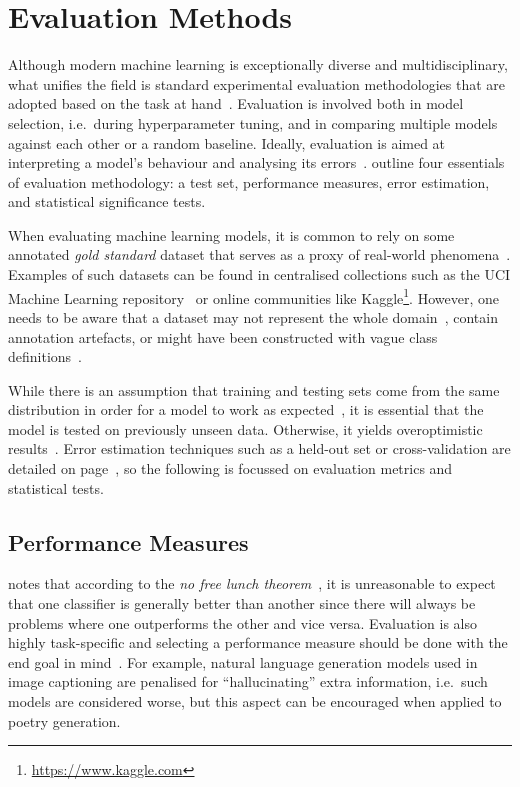\chapter{Evaluation Methods}
\label{ch:evaluation-methods}

Although modern machine learning is exceptionally diverse and multidisciplinary, what unifies the field is standard experimental evaluation methodologies that are adopted based on the task at hand~\citep{Kibler1988}.
%
Evaluation is involved both in model selection, i.e.\ during hyperparameter tuning, and in comparing multiple models against each other or a random baseline.
Ideally, evaluation is aimed at interpreting a model's behaviour and analysing its errors~\citep{Doshi2017}.
%
\citet{Japkowic2011} outline four essentials of evaluation methodology: a test set, performance measures, error estimation, and statistical significance tests.

When evaluating machine learning models, it is common to rely on some annotated \emph{gold standard} dataset that serves as a proxy of real-world phenomena~\citep{Manning2008}.
%
Examples of such datasets can be found in centralised collections such as the UCI Machine Learning repository~\citep{Dua2017} or online communities like Kaggle\footnote{\url{https://www.kaggle.com}}.
However, one needs to be aware that a dataset
may not represent the whole domain~\citep{Japkowic2011},
contain annotation artefacts,
or might have been constructed with vague class definitions~\citep{Hand2006}.

While there is an assumption that training and testing sets come from the same distribution in order for a model to work as expected~\citep{Japkowic2011}, it is essential that the model is tested on previously unseen data.
Otherwise, it yields overoptimistic results~\citep{Kibler1988}.
%
Error estimation techniques such as a held-out set or cross-validation are detailed
on page~\pageref{ch:cross-validation}, so the following is focussed on evaluation metrics and statistical tests.

\section{Performance Measures}
\citet{Stapor17} notes that according to the \emph{no free lunch theorem}~\citep{Wolpert1996}, it is unreasonable to expect that one classifier is generally better than another since there will always be problems where one outperforms the other and vice versa.
Evaluation is also highly task-specific and selecting a performance measure should be done with the end goal in mind~\citep{goodfellow2016deeplearning}. For example, natural language generation models used in image captioning are penalised for ``hallucinating'' extra information, i.e.\ such models are considered worse, but this aspect can be encouraged when applied to poetry generation.

